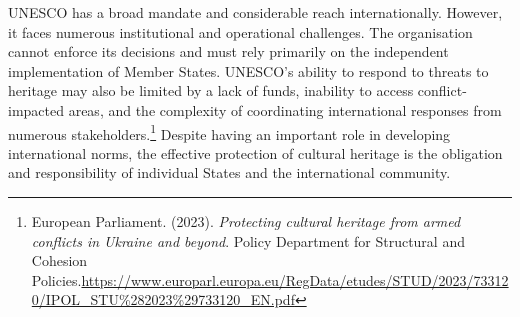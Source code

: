 UNESCO has a broad mandate and considerable reach internationally. However, it faces numerous institutional and operational challenges. The organisation cannot enforce its decisions and must rely primarily on the independent implementation of Member States. UNESCO’s ability to respond to threats to heritage may also be limited by a lack of funds, inability to access conflict-impacted areas, and the complexity of coordinating international responses from numerous stakeholders.\footnote{European Parliament. (2023). \emph{Protecting cultural heritage from armed conflicts in Ukraine and beyond}. Policy Department for Structural and Cohesion Policies.\url{https://www.europarl.europa.eu/RegData/etudes/STUD/2023/733120/IPOL_STU\%282023\%29733120_EN.pdf}} Despite having an important role in developing international norms, the effective protection of cultural heritage is the obligation and responsibility of individual States and the international community.
